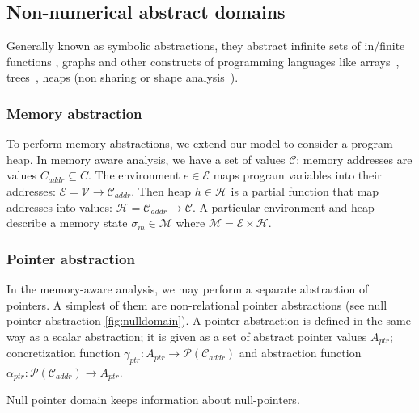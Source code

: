 \subsection{Non-numerical abstract domains}

Generally known as symbolic abstractions, they abstract infinite sets of
in/finite functions \cite{Cousot14}, graphs and other constructs of programming languages like
arrays~\cite{Cousot2011p}, trees~\cite{Mauborgne2000}, heaps (non sharing
\cite{Cousot1977static, Cousot1977rec} or shape analysis~\cite{Reps2002, Chang2008}).

\subsubsection{Memory abstraction}

To perform memory abstractions, we extend our model to consider a program heap.
In memory aware analysis, we have a set of values $\mathcal{C}$; memory addresses are
values $C_{\textit{addr}} \subseteq C$. The environment $e \in \mathcal{E}$
maps program variables into their addresses: $\mathcal{E} = \mathcal{V} \rightarrow \mathcal{C}_{\textit{addr}}$.
Then heap $h \in \mathcal{H}$ is a partial function that map addresses into
values: $\mathcal{H} = \mathcal{C}_{\textit{addr}} \rightarrow \mathcal{C}$.
A particular environment and heap describe a memory state $\sigma_m \in
\mathcal{M}$ where $\mathcal{M} = \mathcal{E} \times \mathcal{H}$.



\subsubsection{Pointer abstraction}

In the memory-aware analysis, we may perform a separate abstraction of
pointers. A simplest of them are non-relational pointer abstractions (see null
pointer abstraction \autoref{fig:nulldomain}). A pointer abstraction is defined
in the same way as a scalar abstraction; it is given as a set of abstract
pointer values $A_{\textit{ptr}}$; concretization function
$\gamma_{\textit{ptr}} : A_{\textit{ptr}} \rightarrow
\mathcal{P}(\mathcal{C}_{\textit{addr}})$ and abstraction function
$\alpha_{\textit{ptr}} : \mathcal{P}(\mathcal{C}_{\textit{addr}}) \rightarrow
A _{\textit{ptr}}$.

\begin{marginfigure}

    \caption{Null pointer domain keeps information about null-pointers.}
    \label{fig:nulldomain}
\end{marginfigure}

